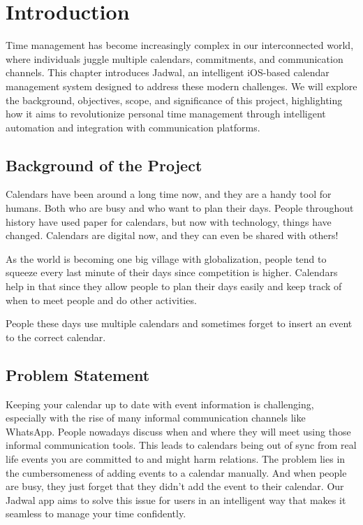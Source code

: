 \documentclass[12pt,a4paper,twoside]{report}
\begin{document}
\chapter{Introduction}

Time management has become increasingly complex in our interconnected world, where individuals juggle multiple calendars, commitments, and communication channels. This chapter introduces Jadwal, an intelligent iOS-based calendar management system designed to address these modern challenges. We will explore the background, objectives, scope, and significance of this project, highlighting how it aims to revolutionize personal time management through intelligent automation and integration with communication platforms.


\section{Background of the Project}

Calendars have been around a long time now, and they are a handy tool for humans. Both who are busy and who want to plan their days. People throughout history have used paper for calendars, but now with technology, things have changed. Calendars are digital now, and they can even be shared with others!

As the world is becoming one big village with globalization, people tend to squeeze every last minute of their days since competition is higher. Calendars help in that since they allow people to plan their days easily and keep track of when to meet people and do other activities.

People these days use multiple calendars and sometimes forget to insert an event to the correct calendar.

\section{Problem Statement}

Keeping your calendar up to date with event information is challenging, especially with the rise of many informal communication channels like WhatsApp. People nowadays discuss when and where they will meet using those informal communication tools. This leads to calendars being out of sync from real life events you are committed to and might harm relations. The problem lies in the cumbersomeness of adding events to a calendar manually. And when people are busy, they just forget that they didn't add the event to their calendar. Our Jadwal app aims to solve this issue for users in an intelligent way that makes it seamless to manage your time confidently.
\end{document}
